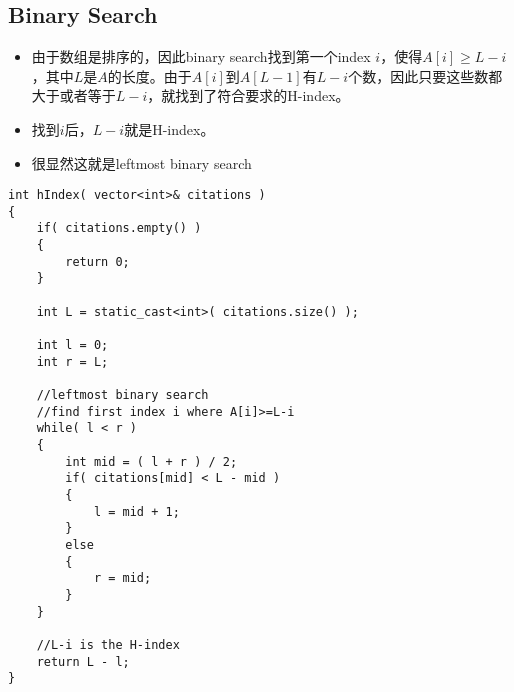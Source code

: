 \subsection{Binary Search}
\begin{itemize}
\item 由于数组是排序的，因此binary search找到第一个index $i$，使得$A[i]\geq L -i $，其中$L$是$A$的长度。由于$A[i]$到$A[L-1]$有$L-i$个数，因此只要这些数都大于或者等于$L-i$，就找到了符合要求的H-index。
\item 找到$i$后，$L-i$就是H-index。
\item 很显然这就是leftmost binary search
\end{itemize}
\setcounter{lstlisting}{0}
\begin{lstlisting}[style=customc, caption={Leftmost Binary Search}]
int hIndex( vector<int>& citations )
{
    if( citations.empty() )
    {
        return 0;
    }

    int L = static_cast<int>( citations.size() );

    int l = 0;
    int r = L;

    //leftmost binary search
    //find first index i where A[i]>=L-i
    while( l < r )
    {
        int mid = ( l + r ) / 2;
        if( citations[mid] < L - mid )
        {
            l = mid + 1;
        }
        else
        {
            r = mid;
        }
    }

    //L-i is the H-index
    return L - l;
}
\end{lstlisting}